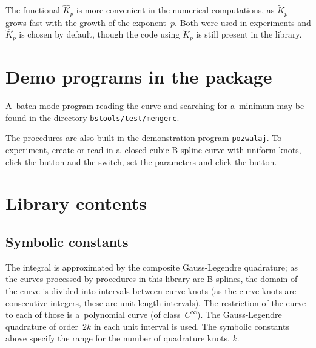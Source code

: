 The functional $\hat{K}_p$ is more convenient in the numerical computations,
as $\tilde{K}_p$ grows fast with the growth of the exponent~$p$. Both were
used in experiments and $\hat{K}_p$ is chosen by default, though the code
using $\tilde{K}_p$ is still present in the library.


\section{Demo programs in the package}

A~batch-mode program reading the curve and searching for a~minimum may be
found in the directory \texttt{bstools/test/mengerc}.

The procedures are also built in the demonstration program \texttt{pozwalaj}.
To experiment, create or read in a~closed cubic B-spline curve with uniform
knots, click the  button and the  switch, set the parameters and click the 
button.


\section{Library contents}
\subsection{Symbolic constants}


The integral is approximated by the composite Gauss-Legendre quadrature; as
the curves processed by procedures in this library are B-splines, the domain
of the curve is divided into intervals between curve knots (as the curve knots
are consecutive integers, these are unit length intervals). The restriction
of the curve to each of those is a~polynomial curve (of class~$C^{\infty}$).
The Gauss-Legendre quadrature of order~$2k$ in each unit interval is used.
The symbolic constants above specify the range for the number of quadrature
knots, $k$.

\vspace{\medskipamount}

